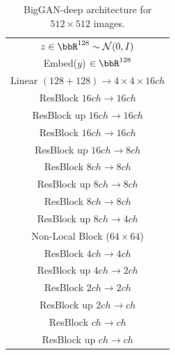 \begin{table}[ht]
         \caption{\label{tab:deep_resnets_imagenet512} BigGAN-deep architecture for $512\times 512$ images.}
          \centering
          \small
          \begin{subtable}{.4\textwidth}
              \centering
              {\begin{tabular}{c}
                  \toprule
                  \midrule
                  $z\in \bbR^{128} \sim \mathcal{N}(0, I)$ \\
                  Embed($y$) $\in \bbR^{128}$ \\
                  \midrule
                  Linear $(128+128) \rightarrow 4 \times 4 \times 16 ch $ \\
                  \midrule
                  ResBlock $16ch \rightarrow 16ch$ \\
                  \midrule
                  ResBlock up $16ch \rightarrow 16ch$ \\
                  \midrule
                  ResBlock $16ch \rightarrow 16ch$ \\
                  \midrule
                  ResBlock up $16ch \rightarrow 8ch$ \\
                  \midrule
                  ResBlock $8ch \rightarrow 8ch$ \\
                  \midrule
                  ResBlock up $8ch \rightarrow 8ch$ \\
                  \midrule
                  ResBlock $8ch \rightarrow 8ch$ \\
                  \midrule
                  ResBlock up $8ch \rightarrow 4ch$ \\
                  \midrule
                  Non-Local Block ($64\times 64$)\\
                  \midrule
                  ResBlock $4ch \rightarrow 4ch$ \\
                  \midrule
                  ResBlock up $4ch \rightarrow 2ch$ \\
                  \midrule
                  ResBlock $2ch \rightarrow 2ch$ \\
                  \midrule
                  ResBlock up $2ch \rightarrow ch$ \\
                  \midrule
                  ResBlock $ch \rightarrow ch$ \\
                  \midrule
                  ResBlock up $ch \rightarrow ch$ \\
                  \midrule

\end{tabular}}
\end{subtable}
\end{table}
